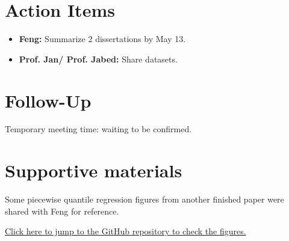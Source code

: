 \documentclass[11pt]{article}
\begin{document}
\section*{Action Items}
\begin{itemize}[leftmargin=1.5em]
    \item \textbf{Feng:} Summarize 2 dissertations by May 13.
    \item \textbf{Prof. Jan/ Prof. Jabed:} Share datasets.
\end{itemize}

\section*{Follow-Up}
Temporary meeting time: waiting to be confirmed.

\section*{Supportive materials}
Some piecewise quantile regression figures from another finished paper were shared with Feng for reference.

\href{https://github.com/Gufeng-2002/Thesis_Meeting_Notes/tree/main/May_5th_25_meeting1/supportive_materials}{Click here to jump to the GitHub repository to check the figures.}
\end{document}
